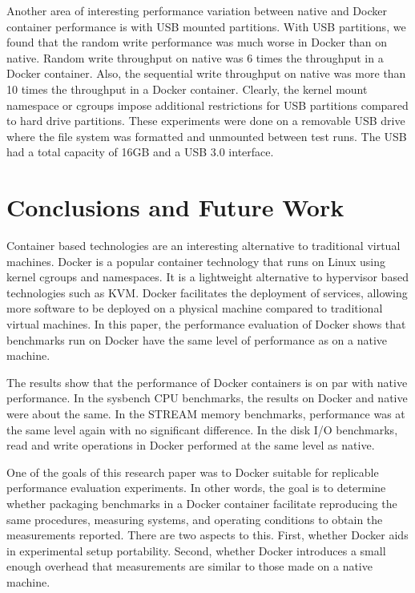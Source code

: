 \documentclass[11pt]{article}
\begin{document}
	Another area of interesting performance variation between native and Docker container performance is with USB mounted partitions. With USB partitions, we found that the random write performance was much worse in Docker than on native. Random write throughput on native was 6 times the throughput in a Docker container. Also, the sequential write throughput on native was more than 10 times the throughput in a Docker container. Clearly, the kernel mount namespace or cgroups impose additional restrictions for USB partitions compared to hard drive partitions. These experiments were done on a removable USB drive where the file system was formatted and unmounted between test runs. The USB had a total capacity of 16GB and a USB 3.0 interface. 
	
	\section{Conclusions and Future Work}
	
	Container based technologies are an interesting alternative to traditional virtual machines. Docker is a popular container technology that runs on Linux using kernel cgroups and namespaces. It is a lightweight alternative to hypervisor based technologies such as KVM. Docker facilitates the deployment of services, allowing more software to be deployed on a physical machine compared to traditional virtual machines. In this paper, the performance evaluation of Docker shows that benchmarks run on Docker have the same level of performance as on a native machine. 
	
	The results show that the performance of Docker containers is on par with native performance. In the sysbench CPU benchmarks, the results on Docker and native were about the same. In the STREAM memory benchmarks, performance was at the same level again with no significant difference. In the disk I/O benchmarks, read and write operations in Docker performed at the same level as native. 
	
	One of the goals of this research paper was to Docker suitable for replicable performance evaluation experiments. In other words, the goal is to determine whether packaging benchmarks in a Docker container facilitate reproducing the same procedures, measuring systems, and operating conditions to obtain the measurements reported. There are two aspects to this. First, whether Docker aids in experimental setup portability. Second, whether Docker introduces a small enough overhead that measurements are similar to those made on a native machine. 
	
\end{document}
